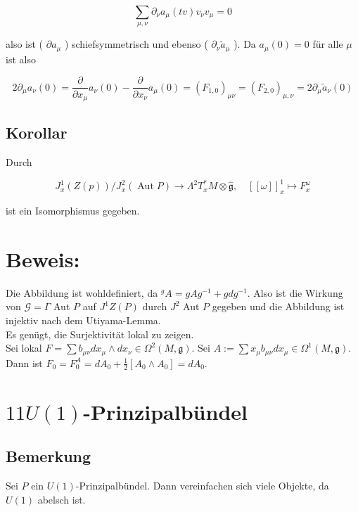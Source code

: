 \documentclass[10pt, letterpaper]{article}
\begin{document}
$$
\sum_{\mu, \nu} \partial_{\nu} a_{\mu}(t v) v_{\nu} v_{\mu}=0
$$

also ist ( $\partial a_{\mu}$ ) schiefsymmetrisch und ebenso ( $\partial_{\nu} \tilde{a}_{\mu}$ ). Da $a_{\mu}(0)=0$ für alle $\mu$ ist also

$$
2 \partial_{\mu} a_{\nu}(0)=\frac{\partial}{\partial x_{\mu}} a_{\nu}(0)-\frac{\partial}{\partial x_{\nu}} a_{\mu}(0)=\left(F_{1,0}\right)_{\mu \nu}=\left(F_{2,0}\right)_{\mu, \nu}=2 \partial_{\mu} \tilde{a}_{\nu}(0)
$$

\subsection*{Korollar}
Durch

$$
J_{x}^{1}(Z(p)) / J_{x}^{2}(\operatorname{Aut} P) \rightarrow \Lambda^{2} T_{x}^{*} M \otimes \hat{\mathfrak{g}}, \quad[[\omega]]_{x}^{1} \mapsto F_{x}^{\omega}
$$

ist ein Isomorphismus gegeben.

\section*{Beweis:}
Die Abbildung ist wohldefiniert, da ${ }^{g} A=g A g^{-1}+g d g^{-1}$. Also ist die Wirkung von $\mathcal{G}=\Gamma$ Aut $P$ auf $J^{1} Z(P)$ durch $J^{2}$ Aut $P$ gegeben und die Abbildung ist injektiv nach dem Utiyama-Lemma.\\
Es genügt, die Surjektivität lokal zu zeigen.\\
Sei lokal $F=\sum b_{\mu \nu} d x_{\mu} \wedge d x_{\nu} \in \Omega^{2}(M, \mathfrak{g})$. Sei $A:=\sum x_{\mu} b_{\mu \nu} d x_{\mu} \in \Omega^{1}(M, \mathfrak{g})$. Dann ist $F_{0}=F_{0}^{A}=d A_{0}+\frac{1}{2}\left[A_{0} \wedge A_{0}\right]=d A_{0}$.

\section*{$11 U(1)$-Prinzipalbündel}
\subsection*{Bemerkung}
Sei $P$ ein $U(1)$-Prinzipalbündel. Dann vereinfachen sich viele Objekte, da $U(1)$ abelsch ist.
\end{document}
